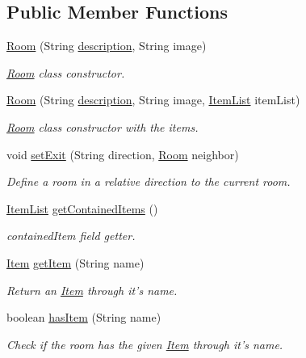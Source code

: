 \subsection*{Public Member Functions}
\begin{DoxyCompactItemize}
\item 
\hyperlink{classRoom_a2cdcbb3d86746330a5a01c7fae4de02c}{Room} (String \hyperlink{classRoom_a2d7ecf802690a6b13750ca6fa6882d77}{description}, String image)
\begin{DoxyCompactList}\small\item\em \hyperlink{classRoom}{Room} class constructor. \end{DoxyCompactList}\item 
\hyperlink{classRoom_ad8cb507b670aec86cf14baa25fadb0f2}{Room} (String \hyperlink{classRoom_a2d7ecf802690a6b13750ca6fa6882d77}{description}, String image, \hyperlink{classItemList}{Item\-List} item\-List)
\begin{DoxyCompactList}\small\item\em \hyperlink{classRoom}{Room} class constructor with the items. \end{DoxyCompactList}\item 
void \hyperlink{classRoom_ae4bc6837f331b5249beb0651fc277018}{set\-Exit} (String direction, \hyperlink{classRoom}{Room} neighbor)
\begin{DoxyCompactList}\small\item\em Define a room in a relative direction to the current room. \end{DoxyCompactList}\item 
\hyperlink{classItemList}{Item\-List} \hyperlink{classRoom_ab9ebd5a52d437f7724bf8474fffae81f}{get\-Contained\-Items} ()
\begin{DoxyCompactList}\small\item\em contained\-Item field getter. \end{DoxyCompactList}\item 
\hyperlink{classItem}{Item} \hyperlink{classRoom_a9b53c8d9f87f4a6d9cc954aeb744d1a2}{get\-Item} (String name)
\begin{DoxyCompactList}\small\item\em Return an \hyperlink{classItem}{Item} through it's name. \end{DoxyCompactList}\item 
boolean \hyperlink{classRoom_ad779b367b26018c9f343ca3044c4b54f}{has\-Item} (String name)
\begin{DoxyCompactList}\small\item\em Check if the room has the given \hyperlink{classItem}{Item} through it's name. \end{DoxyCompactList}\item 

\end{DoxyCompactItemize}
